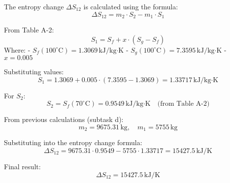 The entropy change \( \Delta S_{12} \) is calculated using the formula:  
\[
\Delta S_{12} = m_2 \cdot S_2 - m_1 \cdot S_1
\]  

From Table A-2:  
\[
S_1 = S_f + x \cdot (S_g - S_f)
\]  
Where:  
- \( S_f(100^\circ\text{C}) = 1.3069 \, \text{kJ/kg·K} \)  
- \( S_g(100^\circ\text{C}) = 7.3595 \, \text{kJ/kg·K} \)  
- \( x = 0.005 \)  

Substituting values:  
\[
S_1 = 1.3069 + 0.005 \cdot (7.3595 - 1.3069) = 1.33717 \, \text{kJ/kg·K}
\]  

For \( S_2 \):  
\[
S_2 = S_f(70^\circ\text{C}) = 0.9549 \, \text{kJ/kg·K} \quad \text{(from Table A-2)}
\]  

From previous calculations (subtask d):  
\[
m_2 = 9675.31 \, \text{kg}, \quad m_1 = 5755 \, \text{kg}
\]  

Substituting into the entropy change formula:  
\[
\Delta S_{12} = 9675.31 \cdot 0.9549 - 5755 \cdot 1.33717 = 15427.5 \, \text{kJ/K}
\]  

Final result:  
\[
\Delta S_{12} = 15427.5 \, \text{kJ/K}
\]